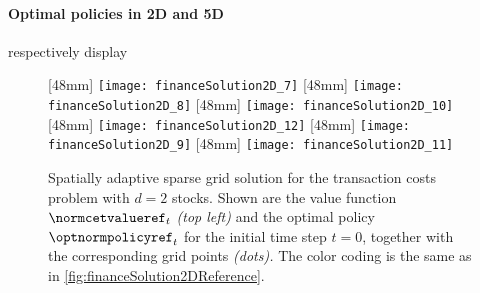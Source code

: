 \paragraph{Optimal policies in 2D and 5D}

respectively display
\begin{figure}
  [48mm]{%
    \texttt{[image: financeSolution2D\_7]}%
  }%
  \hfill%
  [48mm]{%
    \texttt{[image: financeSolution2D\_8]}%
  }%
  \hfill%
  [48mm]{%
    \texttt{[image: financeSolution2D\_10]}%
  }%
  \\[2mm]%
  [48mm]{%
    \texttt{[image: financeSolution2D\_12]}%
  }%
  \hfill%
  [48mm]{%
    \texttt{[image: financeSolution2D\_9]}%
  }%
  \hfill%
  [48mm]{%
    \texttt{[image: financeSolution2D\_11]}%
  }%
  \caption[Sparse grid solution for the two-dimensional TCP]{%
    Spatially adaptive sparse grid solution for the transaction costs problem
    with $d = 2$ stocks.
    \vspace{-0.15em}%
    Shown are the value function $\normcetvalueref_t$ \emph{(top left)} and the
    optimal policy $\optnormpolicyref_t$ for the initial time step $t = 0$,
    together with the corresponding grid points \emph{(dots).}
    The color coding is the same as in
    \cref{fig:financeSolution2DReference}.%
  }%
  \label{fig:financeSolution2DSparseGrid}%
\end{figure}%
